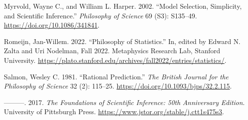 \documentclass[
  letterpaper,
  DIV=11,
  numbers=noendperiod]{scrartcl}
\newlength{\cslhangindent}
\newenvironment{CSLReferences}[2] %
 {\begin{list}{}{%
  \setlength{\itemindent}{0pt}
  \setlength{\leftmargin}{0pt}
  \setlength{\parsep}{0pt}
  \ifodd #1
   \setlength{\leftmargin}{\cslhangindent}
   \setlength{\itemindent}{-1\cslhangindent}
  \fi
  \setlength{\itemsep}{#2\baselineskip}}}
 {\end{list}}
\theoremstyle{definition}
\theoremstyle{remark}
\begin{document}
\begin{CSLReferences}{1}{0}
Myrvold, Wayne C., and William L. Harper. 2002. {``Model Selection,
Simplicity, and Scientific Inference.''} \emph{Philosophy of Science} 69
(S3): S135--49. \url{https://doi.org/10.1086/341841}.

Romeijn, Jan-Willem. 2022. {``Philosophy of Statistics.''} In, edited by
Edward N. Zalta and Uri Nodelman, Fall 2022. Metaphysics Research Lab,
Stanford University.
\url{https://plato.stanford.edu/archives/fall2022/entries/statistics/}.

Salmon, Wesley C. 1981. {``Rational Prediction.''} \emph{The British
Journal for the Philosophy of Science} 32 (2): 115--25.
\url{https://doi.org/10.1093/bjps/32.2.115}.

---------. 2017. \emph{The Foundations of Scientific Inference: 50th
Anniversary Edition}. University of Pittsburgh Press.
\url{https://www.jstor.org/stable/j.ctt1s475s3}.

\end{CSLReferences}
\end{document}
